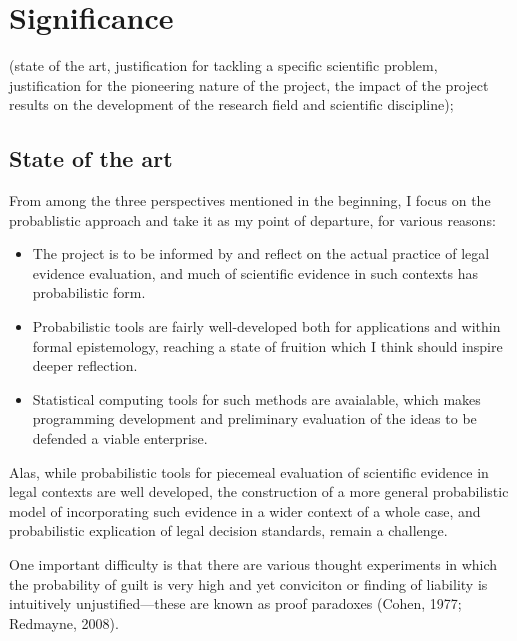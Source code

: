 \documentclass[11pt,dvipsnames,enabledeprecatedfontcommands]{scrartcl}
\begin{document}
\section{Significance}\label{significance}

(state of the art, justification for tackling a specific scientific
problem, justification for the pioneering nature of the project, the
impact of the project results on the development of the research field
and scientific discipline);

\subsection{State of the art}\label{state-of-the-art}

From among the three perspectives mentioned in the beginning, I focus on
the probablistic approach and take it as my point of departure, for
various reasons:

\begin{itemize}
\item
  The project is to be informed by and reflect on the actual practice of
  legal evidence evaluation, and much of scientific evidence in such
  contexts has probabilistic form.
\item
  Probabilistic tools are fairly well-developed both for applications
  and within formal epistemology, reaching a state of fruition which I
  think should inspire deeper reflection.
\item
  Statistical computing tools for such methods are avaialable, which
  makes programming development and preliminary evaluation of the ideas
  to be defended a viable enterprise.
\end{itemize}

Alas, while probabilistic tools for piecemeal evaluation of scientific
evidence in legal contexts are well developed, the construction of a
more general probabilistic model of incorporating such evidence in a
wider context of a whole case, and probabilistic explication of legal
decision standards, remain a challenge.

One important difficulty is that there are various thought experiments
in which the probability of guilt is very high and yet conviciton or
finding of liability is intuitively unjustified---these are known as
proof paradoxes (Cohen, 1977; Redmayne, 2008). 
\end{document}
